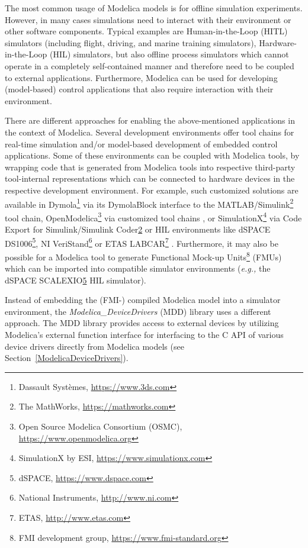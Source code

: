 \documentclass{resources/modelica}
\begin{document}
The most common usage of Modelica models is for offline simulation experiments.
However, in many cases simulations need to interact with their environment or
other software components.
Typical examples are Human-in-the-Loop (HITL) simulators (including flight,
driving, and marine training simulators), Hardware-in-the-Loop (HIL) simulators,
but also offline process simulators which cannot operate in a completely
self-contained manner and therefore need to be coupled to external applications.
Furthermore, Modelica can be used for developing (model-based) control
applications that also require interaction with their environment.

There are different approaches for enabling the above-mentioned applications in
the context of Modelica. Several development environments offer tool chains for
real-time simulation and/or model-based development of embedded control
applications.
Some of these environments can be coupled with Modelica tools, by wrapping code
that is generated from Modelica tools into respective third-party tool-internal
representations which can be connected to hardware devices in the respective
development environment. For example,
such customized solutions are available in
Dymola\footnote{Dassault Systèmes,
\url{https://www.3ds.com}} via its DymolaBlock interface to the
MATLAB/Simulink\footnote{\label{tmw}The MathWorks, \url{https://mathworks.com}}
tool chain, OpenModelica\footnote{Open Source Modelica Consortium (OSMC),
\url{https://www.openmodelica.org}} via customized tool chains
\citep{Worschech2012}, or SimulationX\footnote{SimulationX by ESI,
\url{https://www.simulationx.com}} via Code Export for Simulink/Simulink
Coder\cref{tmw} or HIL environments like dSPACE
DS1006\footnote{\label{dspace}dSPACE, \url{https://www.dspace.com}}, NI
VeriStand\footnote{National Instruments, \url{http://www.ni.com}} or ETAS
LABCAR\footnote{ETAS, \url{http://www.etas.com}} \citep{Blochwitz2009}.
Furthermore, it may also be possible for a Modelica tool to generate Functional
Mock-up Units\footnote{FMI development group,
\url{https://www.fmi-standard.org}} (FMUs) which can be imported into compatible
simulator environments (\textit{e.g.,} the dSPACE SCALEXIO\cref{dspace} HIL simulator).

Instead of embedding the (FMI-) compiled Modelica model into a simulator
environment, the \emph{Modelica\_DeviceDrivers} (MDD) library uses a different approach.
The MDD library provides access to external devices by utilizing Modelica's external
function interface for interfacing to the C API of various device drivers directly from Modelica
models (see Section~\ref{ModelicaDeviceDrivers}).
\end{document}
